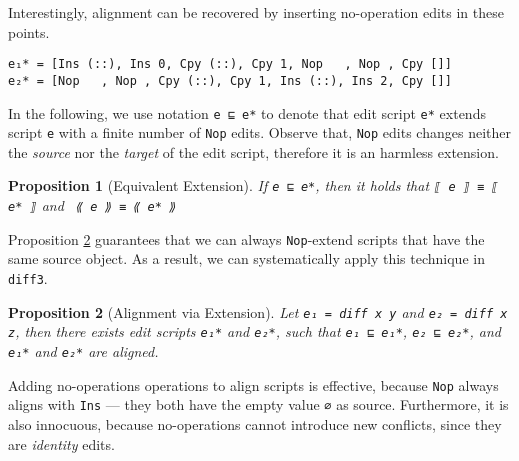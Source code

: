 \documentclass{sigplanconf}
\theoremstyle{plain}
\newtheorem{prop}{Proposition}
\begin{document}
Interestingly, alignment can be recovered by inserting no-operation
edits in these points.
\begin{verbatim}
e₁* = [Ins (::), Ins 0, Cpy (::), Cpy 1, Nop   , Nop , Cpy []]
e₂* = [Nop   , Nop , Cpy (::), Cpy 1, Ins (::), Ins 2, Cpy []] 
\end{verbatim}

In the following, we use notation \texttt{e ⊑ e*} to denote that edit
script \texttt{e*} extends script \texttt{e} with a finite number of
\texttt{Nop} edits.
%
Observe that, \texttt{Nop} edits changes neither the \emph{source} nor the
\emph{target} of the edit script, therefore it is an harmless
extension.
\begin{prop}[Equivalent Extension]
  If \texttt{e ⊑ e*}, then it holds that \texttt{⟦ e ⟧ ≡ ⟦ e* ⟧} and
  \texttt{ ⟪ e ⟫ ≡ ⟪ e* ⟫}
\end{prop}

Proposition \ref{prop:align-ext} guarantees that we can always
\texttt{Nop}-extend scripts that have the same source object.
%
As a result, we can systematically apply this technique in
\texttt{diff3}.
%
\begin{prop}[Alignment via Extension]
\label{prop:align-ext}
  Let \texttt{e₁ = diff x y} and \texttt{e₂ = diff x z}, then there
  exists edit scripts \texttt{e₁*} and \texttt{e₂*}, such that
  \texttt{e₁ ⊑ e₁*}, \texttt{e₂ ⊑ e₂*}, and \texttt{e₁*} and
  \texttt{e₂*} are aligned.
\end{prop}
Adding no-operations operations to align scripts is effective, because
\texttt{Nop} always aligns with \texttt{Ins} --- they both have the
empty value \texttt{∅} as source.
%
Furthermore, it is also innocuous, because no-operations cannot
introduce new conflicts, since they are \emph{identity} edits.



\end{document}
